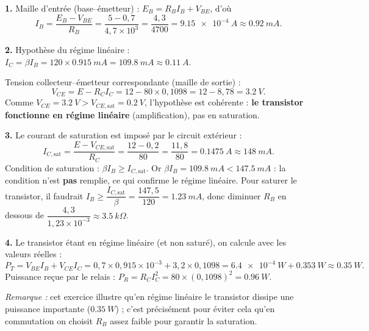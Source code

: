 \documentclass[11pt]{article}
\begin{document}
\begin{corrige}
\textbf{1.} Maille d'entrée (base--émetteur) : $E_B = R_B I_B + V_{BE}$, d'où
\[ I_B = \frac{E_B - V_{BE}}{R_B} = \frac{5 - 0,7}{4,7\times 10^{3}} = \frac{4,3}{4700} = \SI{9,15e-4}{A} \approx \SI{0,92}{mA}. \]

\textbf{2.} Hypothèse du régime linéaire : $I_C = \beta I_B = 120 \times \SI{0,915}{mA} = \SI{109,8}{mA} \approx \SI{0,11}{A}$.

Tension collecteur--émetteur correspondante (maille de sortie) :
\[ V_{CE} = E - R_C I_C = 12 - 80 \times 0,1098 = 12 - 8,78 = \SI{3,2}{V}. \]
Comme $V_{CE} = \SI{3,2}{V} > V_{CE,\text{sat}} = \SI{0,2}{V}$, l'hypothèse est cohérente : \textbf{le transistor fonctionne en régime linéaire} (amplification), pas en saturation.

\textbf{3.} Le courant de saturation est imposé par le circuit extérieur :
\[ I_{C,\text{sat}} = \frac{E - V_{CE,\text{sat}}}{R_C} = \frac{12 - 0,2}{80} = \frac{11,8}{80} = \SI{0,1475}{A} \approx \SI{148}{mA}. \]
Condition de saturation : $\beta I_B \geq I_{C,\text{sat}}$. Or $\beta I_B = \SI{109,8}{mA} < \SI{147,5}{mA}$ : la condition n'est \textbf{pas} remplie, ce qui confirme le régime linéaire. Pour saturer le transistor, il faudrait $I_B \geq \dfrac{I_{C,\text{sat}}}{\beta} = \dfrac{147,5}{120} = \SI{1,23}{mA}$, donc diminuer $R_B$ en dessous de $\dfrac{4,3}{1,23\times 10^{-3}} \approx \SI{3,5}{k\Omega}$.

\textbf{4.} Le transistor étant en régime linéaire (et non saturé), on calcule avec les valeurs réelles :
\[ P_T = V_{BE} I_B + V_{CE} I_C = 0,7 \times 0,915\times 10^{-3} + 3,2 \times 0,1098 = \SI{6,4e-4}{W} + \SI{0,353}{W} \approx \SI{0,35}{W}. \]
Puissance reçue par le relais : $P_R = R_C I_C^2 = 80 \times (0,1098)^2 = \SI{0,96}{W}$.

\emph{Remarque :} cet exercice illustre qu'en régime linéaire le transistor dissipe une puissance importante ($\SI{0,35}{W}$) ; c'est précisément pour éviter cela qu'en commutation on choisit $R_B$ assez faible pour garantir la saturation.
\end{corrige}
\end{document}
